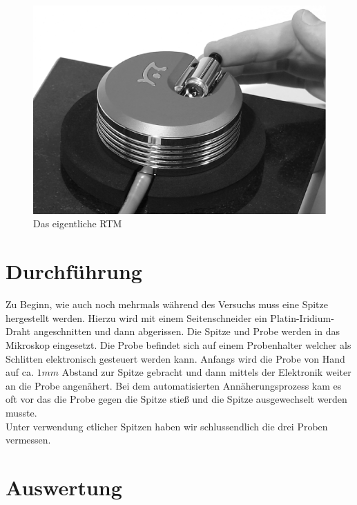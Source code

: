 \documentclass[12pt]{article}
\begin{document}
\begin{figure}[H]
\centering
\includegraphics[width=0.9\linewidth]{pictures/rastertunnel.eps}
\caption{Das eigentliche RTM}
\end{figure}
\section{Durchführung}
Zu Beginn, wie auch noch mehrmals während des Versuchs muss eine Spitze hergestellt werden. Hierzu wird mit einem Seitenschneider ein Platin-Iridium-Draht angeschnitten und dann abgerissen. Die Spitze und Probe werden in das Mikroskop eingesetzt. Die Probe befindet sich auf einem Probenhalter welcher als Schlitten elektronisch gesteuert werden kann. Anfangs wird die Probe von Hand auf ca. $1mm$ Abstand zur Spitze gebracht und dann mittels der Elektronik weiter an die Probe angenähert.
Bei dem automatisierten Annäherungsprozess kam es oft vor das die Probe gegen die Spitze stieß und die Spitze ausgewechselt werden musste. \\

Unter verwendung etlicher Spitzen haben wir schlussendlich die drei Proben vermessen.
\section{Auswertung}
\end{document}
